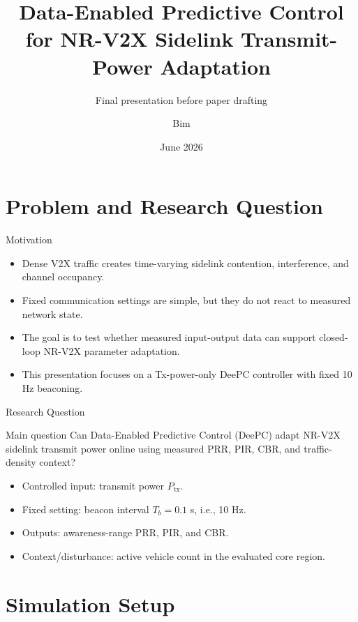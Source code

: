\documentclass[aspectratio=1610,10pt]{beamer}
\title[DeePC for NR-V2X]{Data-Enabled Predictive Control for NR-V2X Sidelink Transmit-Power Adaptation}
\subtitle{Final presentation before paper drafting}
\author{Bim}
\institute{ns-3 NR-V2X / NGSIM US-101 Study}
\date{June 2026}
\newcommand{\tx}{P_{\mathrm{tx}}}
\begin{document}
\begin{frame}
  \titlepage
\end{frame}

\section{Problem and Research Question}

\begin{frame}{Motivation}
  \begin{itemize}
    \item Dense V2X traffic creates time-varying sidelink contention, interference, and channel occupancy.
    \item Fixed communication settings are simple, but they do not react to measured network state.
    \item The goal is to test whether measured input-output data can support closed-loop NR-V2X parameter adaptation.
    \item This presentation focuses on a Tx-power-only DeePC controller with fixed 10 Hz beaconing.
  \end{itemize}
\end{frame}

\begin{frame}{Research Question}
  \begin{block}{Main question}
    Can Data-Enabled Predictive Control (DeePC) adapt NR-V2X sidelink transmit power online using measured PRR, PIR, CBR, and traffic-density context?
  \end{block}

  \vspace{0.5em}
  \begin{itemize}
    \item Controlled input: transmit power $\tx$.
    \item Fixed setting: beacon interval $T_b=0.1$ s, i.e., 10 Hz.
    \item Outputs: awareness-range PRR, PIR, and CBR.
    \item Context/disturbance: active vehicle count in the evaluated core region.
  \end{itemize}
\end{frame}

\section{Simulation Setup}
\end{document}
